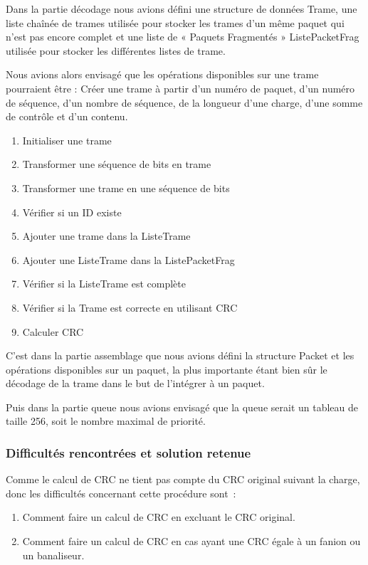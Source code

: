 \documentclass[a4paper,11pt]{article}
\begin{document}
Dans la partie décodage nous avions défini une structure de données Trame, une liste chaînée de trames utilisée pour stocker les trames d'un même paquet qui n'est pas encore complet et une liste de « Paquets Fragmentés » ListePacketFrag utilisée pour stocker les différentes listes de trame.


Nous avions alors envisagé que les opérations disponibles sur une trame pourraient être :
Créer une trame à partir d'un numéro de paquet, d'un numéro de séquence, d'un nombre de séquence, de la longueur d'une charge, d'une somme de contrôle et d'un contenu.
\begin{enumerate}
 \item Initialiser une trame
 \item Transformer une séquence de bits en trame
 \item Transformer une trame en une séquence de bits
 \item Vérifier si un ID existe
 \item Ajouter une trame dans la ListeTrame
 \item Ajouter une ListeTrame dans la ListePacketFrag
 \item Vérifier si la ListeTrame est complète
 \item Vérifier si la Trame est correcte en utilisant CRC
 \item Calculer CRC
\end{enumerate}

C'est dans la partie assemblage que nous avions défini la structure Packet et les opérations disponibles sur un paquet, la plus importante étant bien sûr le décodage de la trame dans le but de l'intégrer à un paquet.

Puis dans la partie queue nous avions envisagé que la queue serait un tableau de taille 256, soit le nombre maximal de priorité. 


\subsubsection{Difficultés rencontrées et solution retenue}

Comme le calcul de CRC ne tient pas compte du CRC original suivant la charge, donc les difficultés concernant cette procédure sont :
\begin{enumerate}
 \item Comment faire un calcul de CRC en excluant le CRC original.
 \item Comment faire un calcul de CRC en cas ayant une CRC égale à un fanion ou un banaliseur.
\end{enumerate}
\end{document}
